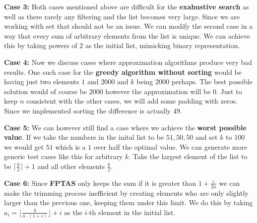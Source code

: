 \documentclass[11pt]{article}
\begin{document}
\textbf{Case 3:} Both cases mentioned above are difficult for the \textbf{exahustive search} as well as there rarely any filtering and the list becomes very large. Since we are working with set that should not be an issue. We can modify the second case in a way that every sum of arbitrary elements from the list is unique. We can achieve this by taking powers of $2$ as the initial list, mimicking binary representation. 

\textbf{Case 4:} Now we discuss cases where approximation algorithms produce very bad results. One such case for the \textbf{greedy algorithm without sorting} would be having just two elements $1$ and $2000$ and $k$ being $2000$ perhaps. The best possible solution would of course be $2000$ however the approximation will be $0$. Just to keep $n$ consistent with the other cases, we will add some padding with zeros. Since we implemented sorting the difference is actually $49$.

\textbf{Case 5:} We can however still find a case where we achieve the \textbf{worst possible value}. If we take the numbers  in the inital list to be $51, 50, 50$ and set $k$ to $100$ we would get $51$ which is a $1$ over half the optimal value. We can generate more generic test cases like this for arbitrary $k$. Take the largest element of the list to be $\lceil \frac{k}{2} \rceil + 1$ and all other elements $\frac{k}{2}$.

\textbf{Case 6:} Since \textbf{FPTAS} only keeps the sum if it is greater than $1 + \frac{\epsilon}{2n}$ we can make the trimming process inefficient by creating elements who are only slightly larger than the previous one, keeping them under this limit. We do this by taking $a_i = \lfloor \frac{k}{n \cdot (1 + \epsilon)} \rfloor + i$ as the $i$-th element in the initial list. 
\end{document}
